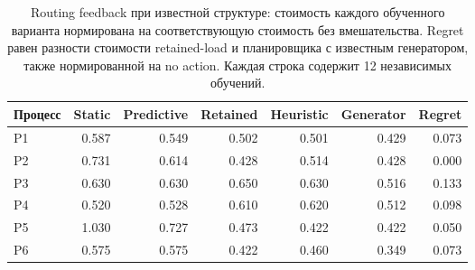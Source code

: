 \begin{table}[t]\caption{Routing feedback при известной структуре: стоимость каждого обученного варианта нормирована на соответствующую стоимость без вмешательства. Regret равен разности стоимости retained-load и планировщика с известным генератором, также нормированной на no action. Каждая строка содержит 12 независимых обучений.}\label{tab:structures_results}\centering\small\setlength{\tabcolsep}{4pt}
\begin{tabular}{lrrrrrr}\toprule
Процесс & Static & Predictive & Retained & Heuristic & Generator & Regret\\\midrule
P1 & 0.587 & 0.549 & 0.502 & 0.501 & 0.429 & 0.073 \\
P2 & 0.731 & 0.614 & 0.428 & 0.514 & 0.428 & 0.000 \\
P3 & 0.630 & 0.630 & 0.650 & 0.630 & 0.516 & 0.133 \\
P4 & 0.520 & 0.528 & 0.610 & 0.620 & 0.512 & 0.098 \\
P5 & 1.030 & 0.727 & 0.473 & 0.422 & 0.422 & 0.050 \\
P6 & 0.575 & 0.575 & 0.422 & 0.460 & 0.349 & 0.073 \\
\bottomrule\end{tabular}\end{table}
